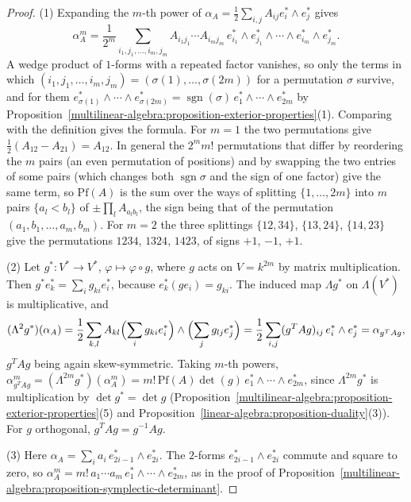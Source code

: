 \begin{proof}
(1) Expanding the $m$-th power of $\alpha_A = \frac12\sum_{i,j}A_{ij}e_i^* \wedge e_j^*$ gives
\[
\alpha_A^m = \frac{1}{2^m}\sum_{i_1, j_1, \ldots, i_m, j_m}A_{i_1j_1} \cdots A_{i_mj_m}\,e_{i_1}^* \wedge e_{j_1}^* \wedge \cdots \wedge e_{i_m}^* \wedge e_{j_m}^* .
\]
A wedge product of $1$-forms with a repeated factor vanishes, so only the terms in which $(i_1, j_1, \ldots, i_m, j_m) = (\sigma(1), \ldots, \sigma(2m))$ for a permutation $\sigma$
survive, and for them $e_{\sigma(1)}^* \wedge \cdots \wedge e_{\sigma(2m)}^* = \operatorname{sgn}(\sigma)\,e_1^* \wedge \cdots \wedge e_{2m}^*$ by
Proposition~\ref{multilinear-algebra:proposition-exterior-properties}(1). Comparing with the definition gives the formula. For $m = 1$ the two permutations give
$\frac12(A_{12} - A_{21}) = A_{12}$. In general the $2^mm!$ permutations that differ by reordering the $m$ pairs (an even permutation of positions) and by swapping
the two entries of some pairs (which changes both $\operatorname{sgn}\sigma$ and the sign of one factor) give the same term, so $\mathrm{Pf}(A)$ is the sum over the ways
of splitting $\{1, \ldots, 2m\}$ into $m$ pairs $\{a_l < b_l\}$ of $\pm\prod_lA_{a_lb_l}$, the sign being that of the permutation $(a_1, b_1, \ldots, a_m, b_m)$. For $m = 2$ the
three splittings $\{12, 34\}$, $\{13, 24\}$, $\{14, 23\}$ give the permutations $1234$, $1324$, $1423$, of signs $+1$, $-1$, $+1$.

(2) Let $g^* \colon V^* \to V^*$, $\varphi \mapsto \varphi \circ g$, where $g$ acts on $V = k^{2m}$ by matrix multiplication. Then $g^*e_k^* = \sum_ig_{ki}e_i^*$, because
$e_k^*(ge_i) = g_{ki}$. The induced map $\Lambda g^*$ on $\Lambda(V^*)$ is multiplicative, and
\[
(\Lambda^2g^*)(\alpha_A) = \frac12\sum_{k, l}A_{kl}\Bigl(\sum_ig_{ki}e_i^*\Bigr) \wedge \Bigl(\sum_jg_{lj}e_j^*\Bigr) = \frac12\sum_{i, j}(g^TAg)_{ij}\,e_i^* \wedge e_j^* = \alpha_{g^TAg},
\]
$g^TAg$ being again skew-symmetric. Taking $m$-th powers, $\alpha_{g^TAg}^m = (\Lambda^{2m}g^*)(\alpha_A^m) = m!\,\mathrm{Pf}(A)\det(g)\,e_1^* \wedge \cdots \wedge e_{2m}^*$, since
$\Lambda^{2m}g^*$ is multiplication by $\det g^* = \det g$ (Proposition~\ref{multilinear-algebra:proposition-exterior-properties}(5) and
Proposition~\ref{linear-algebra:proposition-duality}(3)). For $g$ orthogonal, $g^TAg = g^{-1}Ag$.

(3) Here $\alpha_A = \sum_ia_i\,e_{2i-1}^* \wedge e_{2i}^*$. The $2$-forms $e_{2i-1}^* \wedge e_{2i}^*$ commute and square to zero, so
$\alpha_A^m = m!\,a_1 \cdots a_m\,e_1^* \wedge \cdots \wedge e_{2m}^*$, as in the proof of Proposition~\ref{multilinear-algebra:proposition-symplectic-determinant}.


\end{proof}
